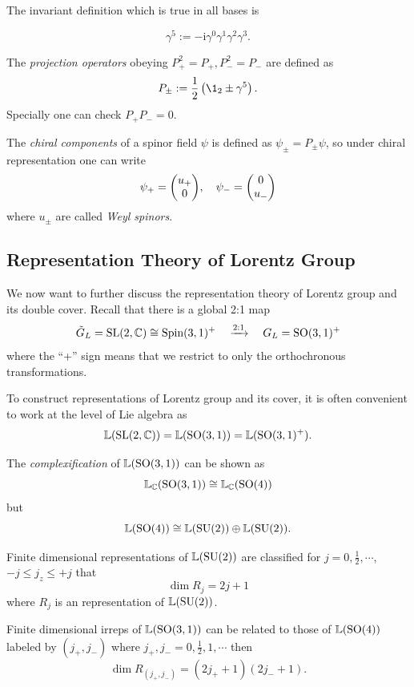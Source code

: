 \documentclass[a4paper,11pt]{article}
\begin{document}
	The invariant definition which is true in all bases is
	\begin{defi}
		\[
		\gamma^5 := - \mathrm{i} \gamma^0 \gamma^1 \gamma^2 \gamma^3.
	\]
	\end{defi}

	\begin{defi}
		The \emph{projection operators} obeying $P_+^2 = P_+, P_-^2 = P_-$ are defined as 
		\[
			P _{\pm} := \frac{1}{2} \left( \1_2 \pm \gamma^5 \right).
		\]
		Specially one can check $P_+ P_- = 0$.
		
		The \emph{chiral components} of a spinor field $\psi$ is defined as $\psi_\pm = P_\pm \psi$, so under chiral representation one can write 
		\[
			\psi_+ = \mqty(u_+\\0), \quad \psi_- = \mqty(0\\u_-)
		\]
		where $u_\pm $ are called \emph{Weyl spinors}.
	\end{defi}

	\subsection{Representation Theory of Lorentz Group} 
	We now want to further discuss the representation theory of Lorentz group and its double cover. Recall that there is a global 2:1 map
	\[
		\tilde G_L = \operatorname{SL}(2,\mathbb{C}) \cong \text{Spin}(3,1)^+ \quad \xrightarrow{2:1} \quad G_L = \operatorname{SO}(3,1)^+
	\]
	where the ``+'' sign means that we restrict to only the orthochronous transformations.

	To construct representations of Lorentz group and its cover, it is often convenient to work at the level of Lie algebra as
	\[
		\mathbb{L}(\operatorname{SL}(2,\mathbb{C})) = \mathbb{L}(\operatorname{SO}(3,1)) = \mathbb{L}(\operatorname{SO}(3,1)^+).
	\]

	The \emph{complexification} of $\mathbb{L}(\operatorname{SO}(3,1))$ can be shown as 
	\[
		\mathbb{L}_\mathbb{C}(\operatorname{SO}(3,1)) \cong \mathbb{L}_\mathbb{C}(\operatorname{SO}(4))
	\]
	but
	\[
		\mathbb{L}(\operatorname{SO}(4)) \cong \mathbb{L}(\operatorname{SU}(2))\oplus \mathbb{L}(\operatorname{SU}(2)).
	\]
	
	Finite dimensional representations of $\mathbb{L}(\operatorname{SU}(2))$ are classified for $j = 0, \frac{1}{2}, \cdots$, $-j \leq j_z \leq +j$ that
	\[
		\dim R_j = 2j + 1
	\]
	where $R_j$ is an representation of $\mathbb{L}(\operatorname{SU}(2))$. 
	
	Finite dimensional irreps of $\mathbb{L}(\operatorname{SO}(3,1))$ can be related to those of $\mathbb{L}(\operatorname{SO}(4))$ labeled by $(j_+,j_-)$ where $j_+, j_- = 0, \frac{1}{2}, 1, \cdots$ then 
	\[
		\dim R _{(j_+, j_-)} = (2j_+ + 1)(2j_- + 1).
	\]
	  
\end{document}
